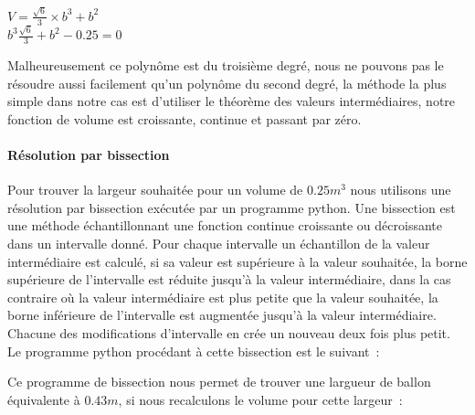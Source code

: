 \documentclass[a4paper,11pt]{article}
\begin{document}
\begin{center}
  $\displaystyle{V = \frac{\sqrt{6}}{3} \times b^3 + b^2 }$ \\
  $\displaystyle{b^3 \frac{\sqrt{6}}{3} + b^2 - 0.25 = 0}$
\end{center}

Malheureusement ce polynôme est du troisième degré, nous ne pouvons pas le résoudre aussi facilement qu'un polynôme du second degré, la méthode la plus simple dans notre cas est d'utiliser le théorème des valeurs intermédiaires, notre fonction de volume est croissante, continue et passant par zéro.



\paragraph{Résolution par bissection}

Pour trouver la largeur souhaitée pour un volume de $0.25m^3$ nous utilisons une résolution par bissection exécutée par un programme python. Une bissection est une méthode échantillonnant une fonction continue croissante ou décroissante dans un intervalle donné. Pour chaque intervalle un échantillon de la valeur intermédiaire est calculé, si sa valeur est supérieure à la valeur souhaitée, la borne supérieure de l'intervalle est réduite jusqu'à la valeur intermédiaire, dans la cas contraire où la valeur intermédiaire est plus petite que la valeur souhaitée, la borne inférieure de l'intervalle est augmentée jusqu'à la valeur intermédiaire. Chacune des modifications d'intervalle en crée un nouveau deux fois plus petit.
\medbreak
Le programme python procédant à cette bissection est le suivant~:



Ce programme de bissection nous permet de trouver une largueur de ballon équivalente à $0.43m$, si nous recalculons le volume pour cette largeur~:
\end{document}
